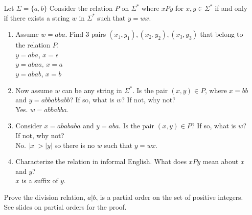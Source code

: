 \documentclass[]{exam}
\theoremstyle{definition}
\newcommand{\bb}[1]{\mathbb{#1}}
\newcommand{\Z}{\bb{Z}}
\begin{document}
\begin{questions}
\question
Let $\Sigma = \{a,b\}$
Consider the relation $P$ on $\Sigma^*$ where $xPy$ for $x,y \in \Sigma^*$
if and only if there exists a string $w$ in $\Sigma^*$ such that $y = wx$. 
\begin{enumerate}[label=\alph*)]
\item Assume $w = aba$. Find $3$ pairs $(x_1,y_1),(x_2,y_2),(x_3,y_3)$ that belong
to the relation $P$.\\
$y = aba$, $x = \epsilon$\\
$y = abaa$, $x = a$\\
$y = abab$, $x = b$\\
\item Now assume $w$ can be any string in $\Sigma^*$. Is the pair $(x,y) \in P$,
where $x = bb$ and $y = abbabbabb$? If so, what is $w$? If not, why
not?\\
Yes. $w = abbabba$.

\item Consider $x = abababa$ and $y = aba$. Is the pair $(x,y) \in P$? If so,
what is $w$? If not, why not?\\
No. $|x| > |y|$ so there is no $w$ such that $y = wx$.

\item Characterize the relation in informal English. What does $xPy$ mean about $x$
and $y$?\\
$x$ is a suffix of $y$.

\end{enumerate}
\question Prove the division relation, $a | b$, is a partial order on the set
of positive integers.\\ 
See slides on partial orders for the proof.
%
%


\end{questions}
\end{document}
